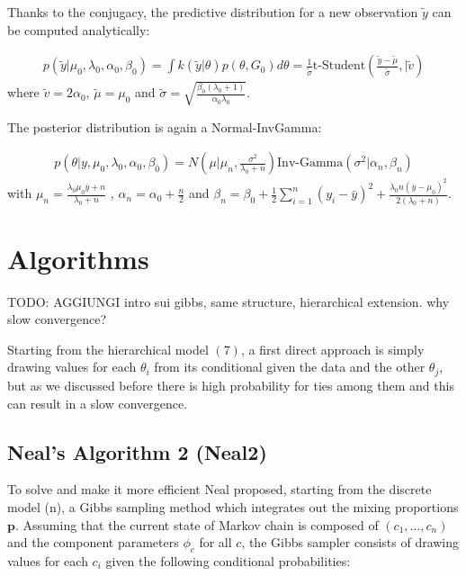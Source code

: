 Thanks to the conjugacy, the predictive distribution for a new observation $\widetilde{y}$ can be computed analytically:

\begin{align}
      p(\widetilde{y}|\mu_0,\lambda_0, \alpha_0, \beta_0)= \int k(\widetilde{y}|\theta)p(\theta, G_0)d\theta= \frac{1}{\widetilde{\sigma}} \text{t-Student}\left(\frac{\widetilde{y}-\widetilde{\mu}}{\widetilde{\sigma}} ,|\widetilde{v}\right)        	
\end{align}
where $\widetilde{v}=2 \alpha_0$, $\widetilde{\mu}=\mu_0$ and $\widetilde{\sigma}= \sqrt{\frac{\beta_0(\lambda_0+1)}{\alpha_0 \lambda_0}}$.

The posterior distribution is again a Normal-InvGamma:

\begin{align}
          p(\theta|y,\mu_0,\lambda_0, \alpha_0, \beta_0)=N\left(\mu | \mu_n ,\frac{\sigma^2} {\lambda_0 + n}\right)\text{Inv-Gamma}(\sigma^2|\alpha_n, \beta_n )
\end{align}
with $\mu_n=\frac{\lambda_0 \mu_0 \bar{y} + n}{\lambda_0 + n}$ , $\alpha_n= \alpha_0 + \frac{n}{2} $ and $\beta_n= \beta_0 + \frac{1}{2}\sum_{i=1}^{n} (y_i-\bar{y})^2 + \frac{\lambda_0 n(\bar{y}-\mu_0)^2}{2(\lambda_0 + n)}$.

\section{Algorithms}
TODO: AGGIUNGI intro sui gibbs, same structure, hierarchical extension. why slow convergence?

Starting from the hierarchical model $(7)$, a first direct approach is simply drawing values for each $\theta_i$ from its conditional given the data and the other $\theta_j$, but as we discussed before there is high probability for ties among them and this can result in a slow convergence. 

\subsection{Neal's Algorithm 2 (Neal2)}

To solve and make it more efficient Neal proposed, starting from the discrete model (n), a Gibbs sampling method which integrates out the mixing proportions $\textbf{p}$. Assuming that the current state of Markov chain is composed of $(c_1,\dots,c_n)$  and the component parameters $\phi_c$ for all $c$, the Gibbs sampler consists of drawing values for each $c_i$ given the following conditional probabilities:


